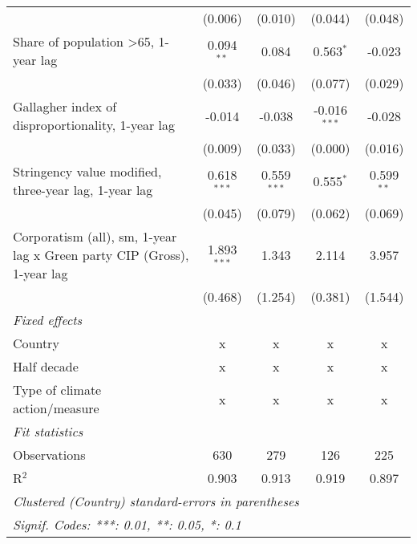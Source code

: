 \begin{table}[htbp]
\begin{tabular}{lcccc}
                                                                              & (0.006)        & (0.010)         & (0.044)         & (0.048)\\   
      Share of population >65, 1-year lag                                     & 0.094$^{**}$   & 0.084           & 0.563$^{*}$     & -0.023\\   
                                                                              & (0.033)        & (0.046)         & (0.077)         & (0.029)\\   
      Gallagher index of disproportionality, 1-year lag                       & -0.014         & -0.038          & -0.016$^{***}$  & -0.028\\   
                                                                              & (0.009)        & (0.033)         & (0.000)         & (0.016)\\   
      Stringency value modified, three-year lag, 1-year lag                   & 0.618$^{***}$  & 0.559$^{***}$   & 0.555$^{*}$     & 0.599$^{**}$\\   
                                                                              & (0.045)        & (0.079)         & (0.062)         & (0.069)\\   
      Corporatism (all), sm, 1-year lag x Green party CIP (Gross), 1-year lag & 1.893$^{***}$  & 1.343           & 2.114           & 3.957\\   
                                                                              & (0.468)        & (1.254)         & (0.381)         & (1.544)\\   
      \emph{Fixed effects}\\
      Country                                                                 & x              & x               & x               & x\\  
      Half decade                                                             & x              & x               & x               & x\\  
      Type of climate action/measure                                          & x              & x               & x               & x\\  
      \midrule \emph{Fit statistics}\\
      Observations                                                            & 630            & 279             & 126             & 225\\  
      R$^2$                                                                   & 0.903          & 0.913           & 0.919           & 0.897\\  
      \midrule
      \multicolumn{5}{l}{\emph{Clustered (Country) standard-errors in parentheses}}\\
      \multicolumn{5}{l}{\emph{Signif. Codes: ***: 0.01, **: 0.05, *: 0.1}}\\
   \end{tabular}
\end{table}


